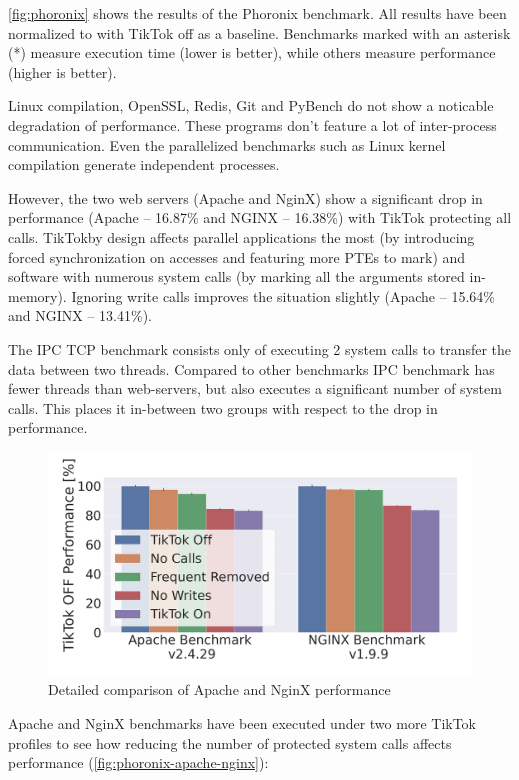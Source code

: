 \documentclass[conference]{IEEEtran}
\newcommand{\sysname}{TikTok}
\begin{document}
\autoref{fig:phoronix} shows the results of the Phoronix benchmark. All
results have been normalized to with \sysname{} off as a baseline. Benchmarks
marked with an asterisk (*) measure execution time (lower is better), while others
measure performance (higher is better).

Linux compilation, OpenSSL, Redis, Git and PyBench do not show a noticable
degradation of performance. These programs don't feature a lot of inter-process
communication. Even the parallelized benchmarks such as Linux kernel compilation
generate independent processes.

However, the two web servers (Apache and NginX) show a significant drop in
performance (Apache -- 16.87\% and NGINX -- 16.38\%) with \sysname{} protecting
all calls. \sysname by design affects parallel applications the most (by
introducing forced synchronization on accesses and featuring more PTEs to mark)
and software with numerous system calls (by marking all the arguments stored
in-memory). Ignoring write calls improves the situation slightly (Apache --
15.64\% and NGINX -- 13.41\%).

The IPC TCP benchmark consists only of executing 2 system calls to transfer
the data between two threads. Compared to other benchmarks IPC benchmark has fewer
threads than web-servers, but also executes a significant number of system calls.
This places it in-between two groups with respect to the drop in performance.

\begin{figure}[]
  \centering
  \includegraphics[width=\linewidth]{graphs/apache-nginx-5.png}
  \caption{Detailed comparison of Apache and NginX performance}
  \label{fig:phoronix-apache-nginx}
\end{figure}

Apache and NginX benchmarks have been executed under two more \sysname{}
profiles to see how reducing the number of protected system calls affects
performance (\autoref{fig:phoronix-apache-nginx}):
\end{document}
